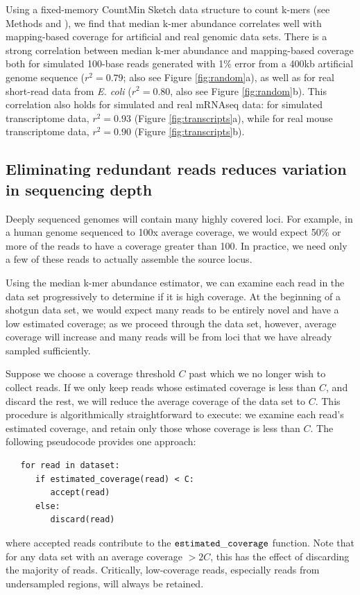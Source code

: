 \documentclass{pnastwo}
\begin{document}
\begin{article}
Using a fixed-memory CountMin Sketch data structure to count k-mers
(see Methods and \cite{countminsketch}), we find that median k-mer
abundance correlates well with mapping-based coverage for artificial
and real genomic data sets.  There is a strong correlation between
median k-mer abundance and mapping-based coverage both for simulated
100-base reads generated with 1\% error from a 400kb artificial genome
sequence ($r^2 = 0.79$; also see Figure \ref{fig:random}a), as well as
for real short-read data from {\em E. coli} ($r^2 = 0.80$, also see
Figure \ref{fig:random}b).  This correlation also holds for simulated
and real mRNAseq data: for simulated transcriptome data, $r^2 = 0.93$
(Figure \ref{fig:transcripts}a), while for real mouse transcriptome
data, $r^2 = 0.90$ (Figure \ref{fig:transcripts}b).


\subsection{Eliminating redundant reads reduces variation in sequencing depth}

Deeply sequenced genomes will contain many highly covered loci.  For
example, in a human genome sequenced to 100x average coverage, we would
expect 50\% or more of the reads to have a coverage greater than 100.
In practice, we need only a few of these reads to actually assemble
the source locus.

Using the median k-mer abundance estimator, we can examine each read
in the data set progressively to determine if it is high coverage.  At
the beginning of a shotgun data set, we would expect many reads to be
entirely novel and have a low estimated coverage; as we proceed
through the data set, however, average coverage will increase and many
reads will be from loci that we have already sampled sufficiently.

Suppose we choose a coverage threshold $C$ past which we no longer
wish to collect reads. If we only keep reads whose estimated coverage
is less than $C$, and discard the rest, we will reduce the average
coverage of the data set to $C$.  This procedure is
algorithmically straightforward to execute: we examine each read's
estimated coverage, and retain only those whose coverage is less than $C$.
The following pseudocode provides one approach:
\begin{verbatim}
   for read in dataset:
      if estimated_coverage(read) < C:
         accept(read)
      else:
         discard(read)
\end{verbatim}
\noindent
where accepted reads contribute to the $\tt estimated\_coverage$
function.  Note that for any data set with an average coverage $> 2C$,
this has the effect of discarding the majority of reads.  Critically,
low-coverage reads, especially reads from undersampled regions, will
always be retained.


\end{article}
\end{document}

